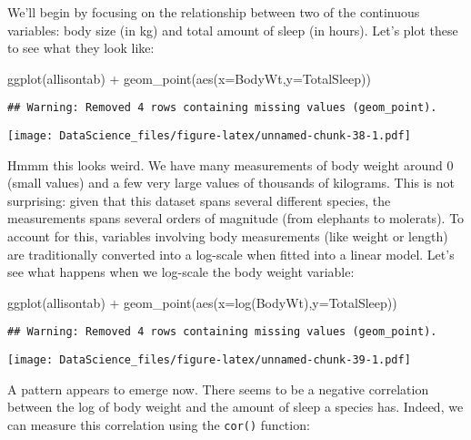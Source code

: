 \documentclass[
]{book}
\newenvironment{Shaded}{\begin{snugshade}}{\end{snugshade}}
\newcommand{\AttributeTok}[1]{\textcolor[rgb]{0.77,0.63,0.00}{#1}}
\newcommand{\FunctionTok}[1]{\textcolor[rgb]{0.00,0.00,0.00}{#1}}
\newcommand{\NormalTok}[1]{#1}
\newcommand{\SpecialCharTok}[1]{\textcolor[rgb]{0.00,0.00,0.00}{#1}}
\begin{document}
We'll begin by focusing on the relationship between two of the continuous variables: body size (in kg) and total amount of sleep (in hours). Let's plot these to see what they look like:

\begin{Shaded}
\begin{Highlighting}[]
\FunctionTok{ggplot}\NormalTok{(allisontab) }\SpecialCharTok{+} \FunctionTok{geom\_point}\NormalTok{(}\FunctionTok{aes}\NormalTok{(}\AttributeTok{x=}\NormalTok{BodyWt,}\AttributeTok{y=}\NormalTok{TotalSleep))}
\end{Highlighting}
\end{Shaded}

\begin{verbatim}
## Warning: Removed 4 rows containing missing values (geom_point).
\end{verbatim}

\texttt{[image: DataScience\_files/figure-latex/unnamed-chunk-38-1.pdf]}

Hmmm this looks weird. We have many measurements of body weight around 0 (small values) and a few very large values of thousands of kilograms. This is not surprising: given that this dataset spans several different species, the measurements spans several orders of magnitude (from elephants to molerats). To account for this, variables involving body measurements (like weight or length) are traditionally converted into a log-scale when fitted into a linear model. Let's see what happens when we log-scale the body weight variable:

\begin{Shaded}
\begin{Highlighting}[]
\FunctionTok{ggplot}\NormalTok{(allisontab) }\SpecialCharTok{+} \FunctionTok{geom\_point}\NormalTok{(}\FunctionTok{aes}\NormalTok{(}\AttributeTok{x=}\FunctionTok{log}\NormalTok{(BodyWt),}\AttributeTok{y=}\NormalTok{TotalSleep))}
\end{Highlighting}
\end{Shaded}

\begin{verbatim}
## Warning: Removed 4 rows containing missing values (geom_point).
\end{verbatim}

\texttt{[image: DataScience\_files/figure-latex/unnamed-chunk-39-1.pdf]}

A pattern appears to emerge now. There seems to be a negative correlation between the log of body weight and the amount of sleep a species has. Indeed, we can measure this correlation using the \texttt{cor()} function:
\end{document}
